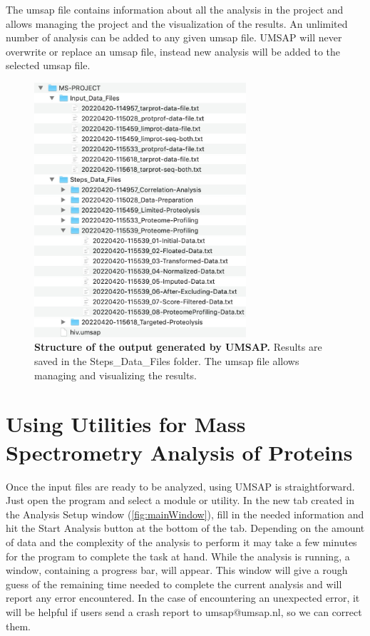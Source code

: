 The umsap file contains information about all the analysis in the project and allows
managing the project and the visualization of the results. An unlimited number of
analysis can be added to any given umsap file. UMSAP will never overwrite or replace
an umsap file, instead new analysis will be added to the selected umsap file.

\begin{figure}[h]
    \centering
    \includegraphics[width=0.7\textwidth]{./IMAGES/OUTPUT/folder.jpg}
    \caption[Structure of the output generated by UMSAP]{\textbf{Structure of the
output generated by UMSAP.} Results are saved in the Steps{\_}Data{\_}Files folder. The
umsap file allows managing and visualizing the results.}
    \label{fig:outFolder}
    \vspace{-5pt}
\end{figure}

\section{Using Utilities for Mass Spectrometry Analysis of Proteins}

Once the input files are ready to be analyzed, using UMSAP is straightforward. Just
open the program and select a module or utility. In the new tab created in the Analysis
Setup window (\autoref{fig:mainWindow}), fill in the needed
information and hit the Start Analysis button at the bottom of the tab. Depending on
the amount of data and the complexity of the analysis to perform it may take a few
minutes for the program to complete the task at hand. While the analysis is running, a
window, containing a progress bar, will appear. This window will give a rough guess
of the remaining time needed to complete the current analysis and will report any error
encountered. In the case of encountering an unexpected error, it will be helpful if
users send a crash report to umsap@umsap.nl, so we can correct them.

